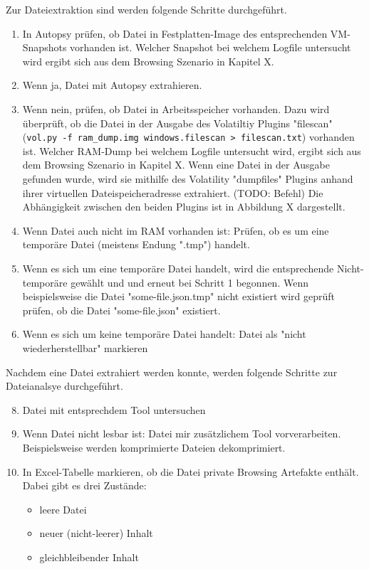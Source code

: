 Zur Dateiextraktion sind werden folgende Schritte durchgeführt.
\begin{enumerate}
\item In Autopsy prüfen, ob Datei in Festplatten-Image des entsprechenden VM-Snapshots vorhanden ist. Welcher Snapshot bei welchem Logfile untersucht wird ergibt sich aus dem Browsing Szenario in Kapitel X. 
\item Wenn ja, Datei mit Autopsy extrahieren.
\item Wenn nein, prüfen, ob Datei in Arbeitsspeicher vorhanden. Dazu wird überprüft, ob die Datei in der Ausgabe des Volatiltiy Plugins "filescan" (\texttt{vol.py -f ram\_dump.img windows.filescan > filescan.txt}) vorhanden ist. Welcher RAM-Dump bei welchem Logfile untersucht wird, ergibt sich aus dem Browsing Szenario in Kapitel X.
Wenn eine Datei in der Ausgabe gefunden wurde, wird sie mithilfe des Volatility "dumpfiles"  Plugins anhand ihrer virtuellen Dateispeicheradresse extrahiert. (TODO: Befehl)
Die Abhängigkeit zwischen den beiden Plugins ist in Abbildung X dargestellt.
\item Wenn Datei auch nicht im RAM vorhanden ist: Prüfen, ob es um eine temporäre Datei (meistens Endung ".tmp") handelt.
\item Wenn es sich um eine temporäre Datei handelt, wird die entsprechende Nicht-temporäre gewählt und und erneut bei Schritt 1 begonnen. Wenn beispielsweise die Datei "some-file.json.tmp" nicht existiert wird geprüft prüfen, ob die Datei "some-file.json" existiert.
\item Wenn es sich um keine temporäre Datei handelt: Datei als "nicht wiederherstellbar"  markieren
\end{enumerate}

Nachdem eine Datei extrahiert werden konnte, werden folgende Schritte zur Dateianalsye durchgeführt.
\begin{enumerate}
	\setcounter{enumi}{7}
	\item Datei mit entsprechdem Tool untersuchen 
	\item Wenn Datei nicht lesbar ist: Datei mir zusätzlichem Tool vorverarbeiten. Beispielsweise werden komprimierte Dateien dekomprimiert. 
	\item In Excel-Tabelle markieren, ob die Datei private Browsing Artefakte enthält. Dabei gibt es drei Zustände: 
	\begin{itemize}
	\item leere Datei
	\item neuer (nicht-leerer) Inhalt
	\item gleichbleibender Inhalt
	\end{itemize}		
\end{enumerate}


